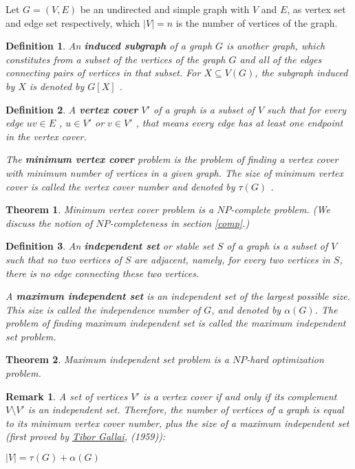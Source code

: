 \documentclass[12pt]{article}
\theoremstyle{slplain}
\newtheorem{theorem}{Theorem}[section]
\newtheorem{defi}{Definition}[section]
\newtheorem{rema}{Remark}[section]
\begin{document}
Let $G = (V, E)$ be an undirected and simple graph with $V$ and $E$, as vertex set and edge set respectively, which $|V| = n$ is the number of vertices of the graph.



\begin{defi}
An {\bf induced subgraph} of a graph $G$ is another graph, which constitutes from a subset of the vertices of the graph $G$ and all of the edges connecting pairs of vertices in that subset. For $X \subseteq V(G)$, the subgraph induced by $X$ is denoted by $G[X]$ .
\end{defi}


\begin{defi}
A {\bf vertex cover} $V'$ of a graph is a subset of $V$ such that for every edge $uv \in E$ , $u \in V'$ or $v \in V'$ , that means every edge has at least one endpoint in the vertex cover. 

The {\bf minimum vertex cover} problem is the problem of finding a vertex  cover with minimum number of vertices in a given graph. The size of minimum vertex cover is called the vertex cover number and denoted by $\tau(G)$ .
\end{defi}

\begin{theorem}
Minimum vertex cover problem is a $NP$-complete problem.\cite{cormen} (We discuss the notion of $NP$-completeness in section \ref{comp}.) 
\end{theorem}

\begin{defi}
An {\bf independent set} or stable set $S$ of a graph is a subset
of $V$ such that no two vertices of $S$ are adjacent, namely, for every two
vertices in $S$, there is no edge connecting these two vertices. 

A {\bf maximum independent set} is an independent set of the largest possible size. This size is called the independence number of $G$, and denoted by $\alpha(G)$. The problem of finding maximum independent set is called the maximum independent set problem.
\end{defi}

\begin{theorem}	
Maximum independent set problem is a $NP$-hard optimization problem.\cite{karp}
\end{theorem}

\begin{rema}
A set of vertices $V'$ is a vertex cover if and only if its complement
$V \setminus V'$ is an independent set. Therefore, the number of vertices of a graph
is equal to its minimum vertex cover number, plus the size of a maximum
independent set (first proved by \href{https://en.wikipedia.org/wiki/Tibor_Gallai}{Tibor Gallai}, (1959)\cite{gallai}):

\vspace{0.5cm}
\begin{center}
$|V| = \tau(G) + \alpha(G)$
\end{center}
\end{rema}
\end{document}

